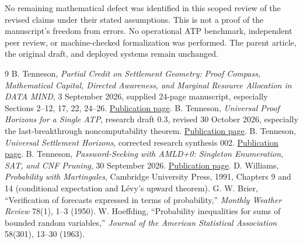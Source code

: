 \documentclass[11pt,letterpaper]{article}
\theoremstyle{definition}\newtheorem{definition}[theorem]{Definition}\newtheorem{example}[theorem]{Example}\newtheorem{conjecture}[theorem]{Conjecture}
\begin{document}
No remaining mathematical defect was identified in this scoped review of the revised claims under their stated assumptions. This is not a proof of the manuscript's freedom from errors. No operational ATP benchmark, independent peer review, or machine-checked formalization was performed. The parent article, the original draft, and deployed systems remain unchanged.
\clearpage
\begin{thebibliography}{9}\small
{} B. Tenneson, \emph{Partial Credit on Settlement Geometry: Proof Compass, Mathematical Capital, Directed Awareness, and Marginal Resource Allocation in DATA MIND}, 3 September 2026, supplied 24-page manuscript, especially Sections 2--12, 17, 22, 24--26. \href{https://btenneson.github.io/pub/cs.LO_Logic_in_Computer_Science/partial_credit_on_settlement_geometry_data_mind/}{Publication page}.
 B. Tenneson, \emph{Universal Proof Horizons for a Single ATP}, research draft 0.3, revised 30 October 2026, especially the last-breakthrough noncomputability theorem. \href{https://btenneson.github.io/pub/cs.LO_Logic_in_Computer_Science/universal_proof_horizons_single_atp_0_3/}{Publication page}.
 B. Tenneson, \emph{Universal Settlement Horizons}, corrected research synthesis 002. \href{https://btenneson.github.io/pub/cs.LO_Logic_in_Computer_Science/universal_settlement_horizons_002/}{Publication page}.
 B. Tenneson, \emph{Password-Seeking with AMLD+0: Singleton Enumeration, SAT, and CNF Pruning}, 30 September 2026. \href{https://btenneson.github.io/pub/cs.LO_Logic_in_Computer_Science/password_seeking_with_amld_plus_0_singleton_enumeration_sat_cnf_pruning/}{Publication page}.
 D. Williams, \emph{Probability with Martingales}, Cambridge University Press, 1991, Chapters 9 and 14 (conditional expectation and L\'evy's upward theorem).
 G. W. Brier, ``Verification of forecasts expressed in terms of probability,'' \emph{Monthly Weather Review} 78(1), 1--3 (1950).
 W. Hoeffding, ``Probability inequalities for sums of bounded random variables,'' \emph{Journal of the American Statistical Association} 58(301), 13--30 (1963).
\end{thebibliography}
\end{document}
